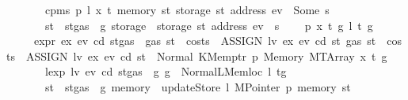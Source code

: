 \begin{isabellebody}
\ \ \ \ \ \ \ {\isachardoublequoteopen}cpm{}s\ p\ l\ x\ t\ {\isacharparenleft}{\kern0pt}memory\ st{\isacharparenright}{\kern0pt}\ {\isacharparenleft}{\kern0pt}storage\ st\ {\isacharparenleft}{\kern0pt}address\ ev{\isacharparenright}{\kern0pt}{\isacharparenright}{\kern0pt}\ {\isacharequal}{\kern0pt}\ Some\ s{\isachardoublequoteclose}\isanewline
\ \ \ \ \ \ \ {\isachardoublequoteopen}st{\isacharprime}{\kern0pt}\ {\isacharequal}{\kern0pt}\ st{\isasymlparr}gas\ {\isacharcolon}{\kern0pt}{\isacharequal}{\kern0pt}\ g{\isacharprime}{\kern0pt}{\isacharcomma}{\kern0pt}\ storage\ {\isacharcolon}{\kern0pt}{\isacharequal}{\kern0pt}\ {\isacharparenleft}{\kern0pt}storage\ st{\isacharparenright}{\kern0pt}\ {\isacharparenleft}{\kern0pt}address\ ev\ {\isacharcolon}{\kern0pt}{\isacharequal}{\kern0pt}\ s{\isacharparenright}{\kern0pt}{\isasymrparr}{\isachardoublequoteclose}\isanewline
\ \ {\isacharbar}{\kern0pt}\ {\isacharparenleft}{\kern0pt}{}{}{\isacharparenright}{\kern0pt}\ p\ x\ t\ g\ l\ t{\isacharprime}{\kern0pt}\ g{\isacharprime}{\kern0pt}\isanewline
\ \ \ \ \ {\isachardoublequoteopen}expr\ ex\ ev\ cd\ {\isacharparenleft}{\kern0pt}st{\isasymlparr}gas\ {\isacharcolon}{\kern0pt}{\isacharequal}{\kern0pt}\ gas\ st\ {\isacharminus}{\kern0pt}\ costs\ \ {\isacharparenleft}{\kern0pt}ASSIGN\ lv\ ex{\isacharparenright}{\kern0pt}\ ev\ cd\ st{\isasymrparr}{\isacharparenright}{\kern0pt}\ {\isacharparenleft}{\kern0pt}gas\ st\ {\isacharminus}{\kern0pt}\ costs\ \ {\isacharparenleft}{\kern0pt}ASSIGN\ lv\ ex{\isacharparenright}{\kern0pt}\ ev\ cd\ st{\isacharparenright}{\kern0pt}\ {\isacharequal}{\kern0pt}\ Normal\ {\isacharparenleft}{\kern0pt}{\isacharparenleft}{\kern0pt}KMemptr\ p{\isacharcomma}{\kern0pt}\ Memory\ {\isacharparenleft}{\kern0pt}MTArray\ x\ t{\isacharparenright}{\kern0pt}{\isacharparenright}{\kern0pt}{\isacharcomma}{\kern0pt}\ g{\isacharparenright}{\kern0pt}{\isachardoublequoteclose}\isanewline
\ \ \ \ \ \ \ {\isachardoublequoteopen}lexp\ lv\ ev\ cd\ {\isacharparenleft}{\kern0pt}st{\isasymlparr}gas\ {\isacharcolon}{\kern0pt}{\isacharequal}{\kern0pt}\ g{\isasymrparr}{\isacharparenright}{\kern0pt}\ g\ {\isacharequal}{\kern0pt}\ Normal{\isacharparenleft}{\kern0pt}{\isacharparenleft}{\kern0pt}LMemloc\ l{\isacharcomma}{\kern0pt}\ t{\isacharprime}{\kern0pt}{\isacharparenright}{\kern0pt}{\isacharcomma}{\kern0pt}g{\isacharprime}{\kern0pt}{\isacharparenright}{\kern0pt}{\isachardoublequoteclose}\isanewline
\ \ \ \ \ \ \ {\isachardoublequoteopen}st{\isacharprime}{\kern0pt}\ {\isacharequal}{\kern0pt}\ st{\isasymlparr}gas\ {\isacharcolon}{\kern0pt}{\isacharequal}{\kern0pt}\ g{\isacharprime}{\kern0pt}{\isacharcomma}{\kern0pt}\ memory\ {\isacharcolon}{\kern0pt}{\isacharequal}{\kern0pt}\ updateStore\ l\ {\isacharparenleft}{\kern0pt}MPointer\ p{\isacharparenright}{\kern0pt}\ {\isacharparenleft}{\kern0pt}memory\ st{\isacharparenright}{\kern0pt}{\isasymrparr}{\isachardoublequoteclose}\isanewline

\end{isabellebody}
